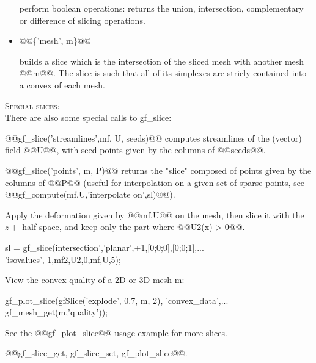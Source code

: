 \begin{cmddescription}
\begin{itemize}
    perform boolean operations: returns the union, intersection, complementary
    or difference of slicing operations.

  \item @@\{'mesh', \tmesh m\}@@

    builds a slice which is the intersection of the sliced mesh with
    another mesh @@m@@. The slice is such that all of its simplexes are
    stricly contained into a convex of each mesh.

\end{itemize}
\noindent\textsc{Special slices:}\\
  There are also some special calls to gf_slice:

  @@gf_slice('streamlines',\tmf mf, \tvec U, \tmat seeds)@@
  computes streamlines of the (vector) field @@U@@, with seed points given
  by the columns of @@seeds@@.

  @@gf_slice('points', \tmesh m, \tmat P)@@
  returns the "slice" composed of points given by the columns of @@P@@
  (useful for interpolation on a given set of sparse points, see
  @@gf_compute(mf,U,'interpolate on',sl)@@).
\end{cmddescription}
\begin{cmdexamples}

Apply the deformation given by @@mf,U@@ on the mesh, then slice it with the $z+$ half-space, and keep only the part where @@U2(x) > 0@@.
\begin{mcode}
sl = gf_slice({intersection',{'planar',+1,[0;0;0],[0;0;1]},...
     {'isovalues',-1,mf2,U2,0}},mf,U,5);
\end{mcode}
  
View the convex quality of a 2D or 3D mesh m:
\begin{mcode}
  gf_plot_slice(gfSlice({'explode', 0.7}, m, 2), 'convex_data',...
                gf_mesh_get(m,'quality'));
\end{mcode}
See the @@gf_plot_slice@@ usage example for more slices.
\end{cmdexamples}

\begin{gfseealso}
  @@gf_slice_get, gf_slice_set, gf_plot_slice@@.
\end{gfseealso}
\newpage

